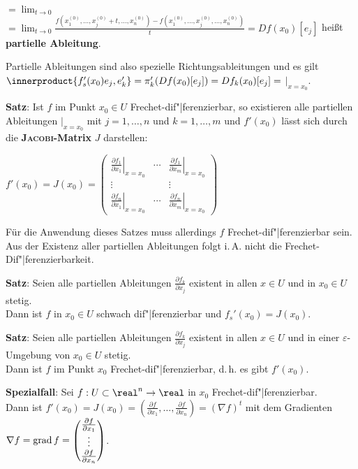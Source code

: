 $=
\lim_{t \to 0}$  $=
\lim_{t \to 0} \frac{f(x_1^{(0)}, \dotsc, x_j^{(0)} + t, \dotsc, x_n^{(0)}) -
f(x_1^{(0)}, \dotsc, x_j^{(0)}, \dotsc, x_n^{(0)})}{t} =
Df(x_0)[e_j]$
heißt \textbf{partielle Ableitung}.

Partielle Ableitungen sind also spezielle Richtungsableitungen und es gilt \\
$\innerproduct{f_s'(x_0)e_j, e_k'} = \pi_k'(Df(x_0)[e_j]) = Df_k(x_0)[e_j] =$
$\Big|_{x=x_0}$.

\linie

\textbf{Satz}:
Ist $f$ im Punkt $x_0 \in U$ Frechet-dif"|ferenzierbar, so existieren
alle partiellen Ableitungen
$\Big|_{x=x_0}$
mit $j = 1, \dotsc, n$ und $k = 1, \dotsc, m$
und $f'(x_0)$ lässt sich durch die \textbf{\textsc{Jacobi}-Matrix} $J$
darstellen:

$f'(x_0) = J(x_0) = \begin{pmatrix}
\left.\frac{\partial f_1}{\partial x_1}\right|_{x=x_0} &
\cdots &
\left.\frac{\partial f_1}{\partial x_m}\right|_{x=x_0} \\
\vdots & & \vdots \\
\left.\frac{\partial f_n}{\partial x_1}\right|_{x=x_0} &
\cdots &
\left.\frac{\partial f_n}{\partial x_m}\right|_{x=x_0}
\end{pmatrix}$

Für die Anwendung dieses Satzes muss allerdings $f$ Frechet-dif"|ferenzierbar
sein.
Aus der Existenz aller partiellen Ableitungen folgt i.\,A. nicht
die Frechet-Dif"|ferenzierbarkeit.

\linie

\textbf{Satz}:
Seien alle partiellen Ableitungen $\frac{\partial f_k}{\partial x_j}$
existent in allen $x \in U$ und in $x_0 \in U$ stetig. \\
Dann ist $f$ in $x_0 \in U$ schwach dif"|ferenzierbar
und $f_s'(x_0) = J(x_0)$.

\textbf{Satz}:
Seien alle partiellen Ableitungen $\frac{\partial f_k}{\partial x_j}$
existent in allen $x \in U$ und in einer $\varepsilon$-Umgebung von
$x_0 \in U$ stetig. \\
Dann ist $f$ im Punkt $x_0$ Frechet-dif"|ferenzierbar,
d.\,h. es gibt $f'(x_0)$.

\linie

\textbf{Spezialfall}:
Sei $f: U \subset \real^n \rightarrow \real$ in $x_0$
Frechet-dif"|ferenzierbar. \\
Dann ist $f'(x_0) = J(x_0) = (\frac{\partial f}{\partial x_1}, \dotsc,
\frac{\partial f}{\partial x_n}) = (\nabla f)^t$ mit dem Gradienten
$\nabla f = \operatorname{grad} f = \begin{pmatrix}\frac{\partial f}{\partial x_1} \\
\vdots \\ \frac{\partial f}{\partial x_n}\end{pmatrix}$.

